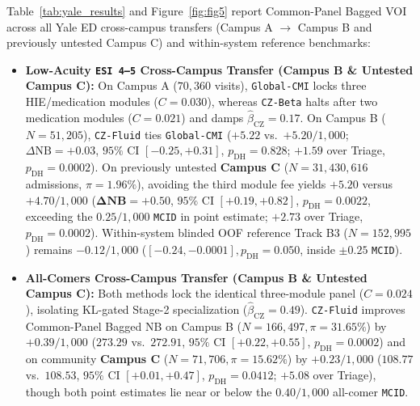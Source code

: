 \documentclass[11pt]{article}
\begin{document}
Table~\ref{tab:yale_results} and Figure~\ref{fig:fig5} report Common-Panel Bagged VOI across all Yale ED cross-campus transfers (Campus A $\to$ Campus B and previously untested Campus C) and within-system reference benchmarks:
\begin{itemize}
  \item \textbf{Low-Acuity \texttt{ESI 4--5} Cross-Campus Transfer (Campus B \& Untested Campus C):} On Campus A ($70{,}360$ visits), \texttt{Global-CMI} locks three HIE/medication modules ($C=0.030$), whereas \texttt{CZ-Beta} halts after two medication modules ($C=0.021$) and damps $\hat{\beta}_{\text{CZ}}=0.17$. On Campus B ($N=51{,}205$), \texttt{CZ-Fluid} ties \texttt{Global-CMI} ($+5.22$ vs.\ $+5.20/1{,}000$; $\Delta\text{NB}=+0.03$, $95\%$ CI $[-0.25, +0.31]$, $p_{\text{DH}}=0.828$; $+\mathbf{1.59}$ over Triage, $p_{\text{DH}}=0.0002$). On previously untested \textbf{Campus C} ($N=31{,}430, 616$ admissions, $\pi=1.96\%$), avoiding the third module fee yields $\mathbf{+5.20}$ versus $+4.70/1{,}000$ ($\mathbf{\Delta\text{NB}=+0.50}$, $95\%$ CI $[+0.19, +0.82]$, $p_{\text{DH}}=\mathbf{0.0022}$, exceeding the $0.25/1{,}000$ \texttt{MCID} in point estimate; $+\mathbf{2.73}$ over Triage, $p_{\text{DH}}=0.0002$). Within-system blinded OOF reference Track B3 ($N=152{,}995$) remains $-0.12/1{,}000$ ($[-0.24, -0.0001], p_{\text{DH}}=0.050$, inside $\pm 0.25$ \texttt{MCID}).
  \item \textbf{All-Comers Cross-Campus Transfer (Campus B \& Untested Campus C):} Both methods lock the identical three-module panel ($C=0.024$), isolating KL-gated Stage-2 specialization ($\hat{\beta}_{\text{CZ}}=0.49$). \texttt{CZ-Fluid} improves Common-Panel Bagged NB on Campus B ($N=166{,}497, \pi=31.65\%$) by $\mathbf{+0.39}/1{,}000$ ($273.29$ vs.\ $272.91$, $95\%$ CI $[+0.22, +0.55]$, $p_{\text{DH}}=0.0002$) and on community \textbf{Campus C} ($N=71{,}706, \pi=15.62\%$) by $\mathbf{+0.23}/1{,}000$ ($108.77$ vs.\ $108.53$, $95\%$ CI $[+0.01, +0.47]$, $p_{\text{DH}}=0.0412$; $+5.08$ over Triage), though both point estimates lie near or below the $0.40/1{,}000$ all-comer \texttt{MCID}.

\end{itemize}
\end{document}
